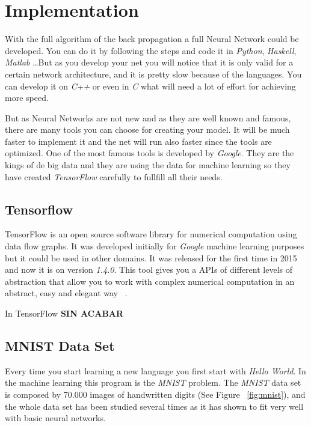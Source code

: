 \section{Implementation}
With the full algorithm of the back propagation a full Neural Network could be developed. You can do it by following the steps and code it in \textit{Python}, \textit{Haskell}, \textit{Matlab} \dots But as you develop your net you will notice that it is only valid for a certain network architecture, and it is pretty slow because of the languages. You can develop it on \textit{C++} or even in \textit{C} what will need a lot of effort for achieving more speed.

But as Neural Networks are not new and as they are well known and famous, there are many tools you can choose for creating your model. It will be much faster to implement it and the net will run also faster since the tools are optimized. One of the most famous tools is developed by \textit{Google}. They are the kings of de big data and they are using the data for machine learning so they have created \textit{TensorFlow} carefully to fullfill all their needs.

\subsection{Tensorflow}
TensorFlow is an open source software library for numerical computation using data flow graphs. It was developed initially for \textit{Google} machine learning purposes but it could be used in other domains. It was released for the first time in 2015 and now it is on version \textit{1.4.0}. This tool gives you a APIs of different levels of abstraction that allow you to work with complex numerical computation in an abstract, easy and elegant way ~\cite{amy}.

In TensorFlow \textbf{SIN ACABAR}

\subsection{MNIST Data Set}
Every time you start learning a new language you first start with \textit{Hello World}. In the machine learning this program is the \textit{MNIST} problem. The \textit{MNIST} data set is composed by 70.000 images of handwritten digits (See Figure ~\ref{fig:mnist}), and the whole data set has been studied several times as it has shown to fit very well with basic neural networks.

